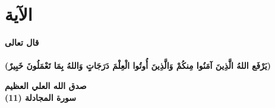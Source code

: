 \chapter*{الآية}

\begin{Large}
	\textbf{قال تعالى}\\
\\
\noindent
\textbf{(يَرْفَع اللهُ الَّذِينَ آمَنُوا مِنكُمْ وَالَّذِينَ أُوتُوا الْعِلْمَ دَرَجَاتٍ وَاللهُ بِمَا تَعْمَلُونَ خَبِيرٌ)}
\begin{flushleft}
\textbf{صدق الله العلي العظيم}\\
\noindent
\textbf{سورة المجادلة (11)}
\end{flushleft}
\end{Large}



